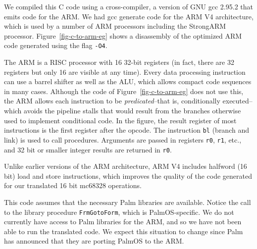 We compiled this C code using a cross-compiler,
a version of GNU gcc 2.95.2 that emits code for the ARM.
We had gcc generate code for the ARM V4 architecture,
which is used by a number of ARM processors
including the StrongARM processor.
Figure~\ref{fig-c-to-arm-eg} shows a disassembly
of the optimized ARM code generated using the flag \texttt{-O4}.

The ARM is a RISC processor with 16 32-bit registers
(in fact, there are 32 registers but only 16 are visible at any time).
Every data processing instruction can use a barrel shifter
as well as the ALU,
which allows compact code sequences in many cases.
Although the code of Figure~\ref{fig-c-to-arm-eg}
does not use this,
the ARM allows each instruction to be \emph{predicated}--that is,
conditionally executed--which avoids the pipeline stalls
that would result from the branches
otherwise used to implement conditional code.
In the figure, the result register of most instructions
is the first register after the opcode.
The instruction \texttt{bl} (branch and link) is used to call procedures.
Arguments are passed in registers \texttt{r0}, \texttt{r1}, etc.,
and 32 bit or smaller integer results are returned in \texttt{r0}.

Unlike earlier versions of the ARM architecture,
ARM V4 includes halfword (16 bit) load and store instructions,
which improves the quality of the code generated 
for our translated 16 bit mc68328 operations.

This code assumes that the necessary Palm libraries are available.
Notice the call to the library procedure \texttt{FrmGotoForm},
which is PalmOS-specific.  
We do not currently have access to Palm libraries for the ARM,
and so we have not been able to run the translated code.
We expect this situation to change 
since Palm has announced that they are porting PalmOS
to the ARM.

